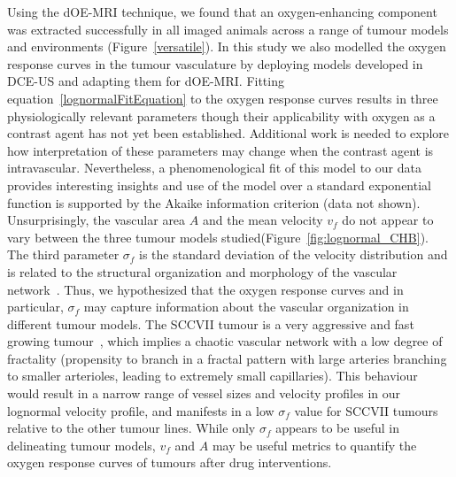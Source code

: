 Using the \acs{dOE-MRI} technique, we found that an oxygen-enhancing component was extracted successfully in all imaged animals across a range of tumour models and environments (Figure~\ref{versatile}).
In this study we also modelled the oxygen response curves in the tumour vasculature by deploying models developed in \acs{DCE-US} and adapting them for \acs{dOE-MRI}.
Fitting equation~\ref{lognormalFitEquation} to the oxygen response curves results in three physiologically relevant parameters though their applicability with oxygen as a contrast agent has not yet been established.
Additional work is needed to explore how interpretation of these parameters may change when the contrast agent is intravascular. 
Nevertheless, a phenomenological fit of this model to our data provides interesting insights and use of the model over a standard exponential function is supported by the Akaike information criterion (data not shown).
Unsurprisingly, the vascular area $A$ and the mean velocity $v_f$ do not appear to vary between the three tumour models studied(Figure~\ref{fig:lognormal_CHB}).
The third parameter $\sigma_f$ is the standard deviation of the velocity distribution and is related to the structural organization and morphology of the vascular network~\cite{Hudson:2009jv}.
Thus, we hypothesized that the oxygen response curves and in particular, $\sigma_f$ may capture information about the vascular organization in different tumour models.
The SCCVII tumour is a very aggressive and fast growing tumour~\cite{Khurana:2001wb}, which implies a chaotic vascular network with a low degree of fractality (propensity to branch in a fractal pattern with large arteries branching to smaller arterioles, leading to extremely small capillaries).
This behaviour would result in a narrow range of vessel sizes and velocity profiles in our lognormal velocity profile,  and manifests in a low $\sigma_f$ value for SCCVII tumours relative to the other tumour lines.
While only $\sigma_f$ appears to be useful in delineating tumour models, $v_f$ and $A$ may be useful metrics to quantify the oxygen response curves of tumours after drug interventions. 
  
